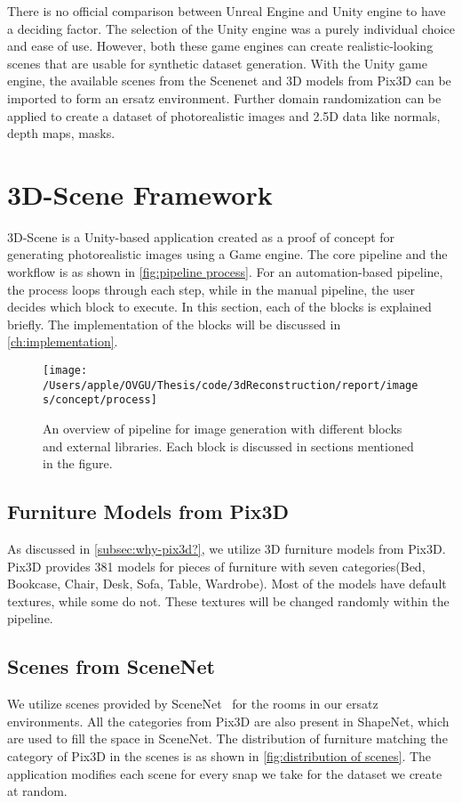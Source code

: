 There is no official comparison between Unreal Engine and Unity engine to have a deciding factor.
The selection of the Unity engine was a purely individual choice and ease of use.
However, both these game engines can create realistic-looking scenes that are usable for synthetic dataset generation.
With the Unity game engine, the available scenes from the Scenenet and 3D models from Pix3D can be imported to form an ersatz environment.
Further domain randomization can be applied to create a dataset of photorealistic images and 2.5D data like normals, depth maps, masks.


\section{3D-Scene Framework}\label{sec:3d-scene-framework}
3D-Scene is a Unity-based application created as a proof of concept for generating photorealistic images using a Game engine.
The core pipeline and the workflow is as shown in \autoref{fig:pipeline process}.
For an automation-based pipeline, the process loops through each step, while in the manual pipeline, the user decides which block to execute.
In this section, each of the blocks is explained briefly.
The implementation of the blocks will be discussed in \autoref{ch:implementation}.

\begin{figure}[!ht]
    \centering
    \texttt{[image: /Users/apple/OVGU/Thesis/code/3dReconstruction/report/images/concept/process]}
    \caption[Overview of 3D-Scene Tool]{An overview of pipeline for image generation with different blocks and external libraries.
    Each block is discussed in sections mentioned in the figure.}
    \label{fig:pipeline process}
\end{figure}

\subsection{Furniture Models from Pix3D}\label{subsec:furniture-models-from-pix3d}
As discussed in \autoref{subsec:why-pix3d?}, we utilize 3D furniture models from Pix3D.
Pix3D provides 381 models for pieces of furniture with seven categories(Bed, Bookcase, Chair, Desk, Sofa, Table, Wardrobe).
Most of the models have default textures, while some do not.
These textures will be changed randomly within the pipeline.

\subsection{Scenes from SceneNet}\label{subsec:scenes-from-scenenet}
We utilize scenes provided by SceneNet~\cite{McCormac2017} for the rooms in our ersatz environments.
All the categories from Pix3D are also present in ShapeNet, which are used to fill the space in SceneNet.
The distribution of furniture matching the category of Pix3D in the scenes is as shown in \autoref{fig:distribution of scenes}.
The application modifies each scene for every snap we take for the dataset we create at random.

